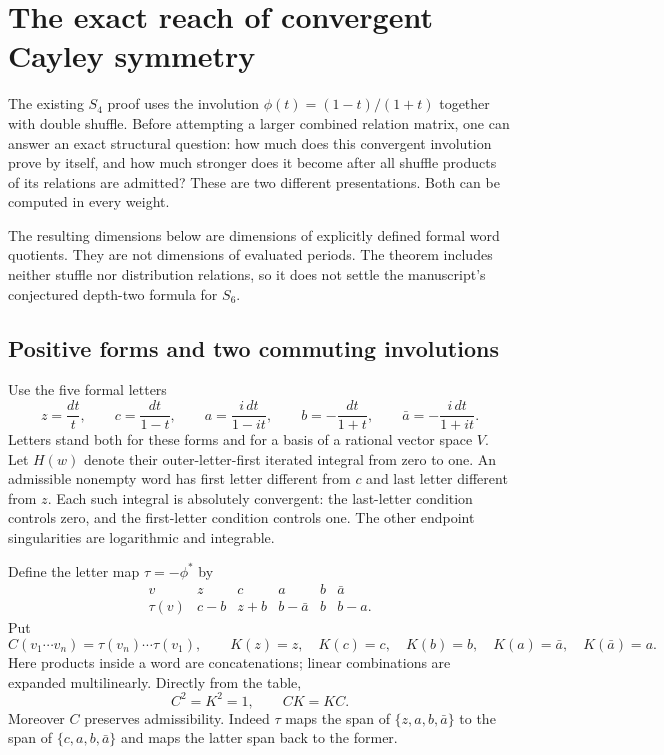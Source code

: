 \section{The exact reach of convergent Cayley symmetry}
\label{cayley:sec:reach}

The existing $S_4$ proof uses the involution
$\phi(t)=(1-t)/(1+t)$ together with double shuffle.  Before attempting a
larger combined relation matrix, one can answer an exact structural
question: how much does this convergent involution prove by itself, and
how much stronger does it become after all shuffle products of its
relations are admitted?  These are two different presentations.  Both
can be computed in every weight.

The resulting dimensions below are dimensions of explicitly defined
formal word quotients.  They are not dimensions of evaluated periods.
The theorem includes neither stuffle nor distribution relations, so it
does not settle the manuscript's conjectured depth-two formula for $S_6$.

\subsection{Positive forms and two commuting involutions}

Use the five formal letters
\[
 z=\frac{dt}{t},\qquad c=\frac{dt}{1-t},\qquad
 a=\frac{i\,dt}{1-it},\qquad
 b=-\frac{dt}{1+t},\qquad
 \bar a=-\frac{i\,dt}{1+it}.
\]
Letters stand both for these forms and for a basis of a rational vector
space $V$.  Let $H(w)$ denote their outer-letter-first iterated integral
from zero to one.  An admissible nonempty word has first letter different
from $c$ and last letter different from $z$.  Each such integral is
absolutely convergent: the last-letter condition controls zero, and the
first-letter condition controls one.  The other endpoint singularities
are logarithmic and integrable.

Define the letter map $\tau=-\phi^*$ by
\begin{equation}\label{cayley:eq:tau}
\begin{array}{c|ccccc}
v&z&c&a&b&\bar a\\ \hline
\tau(v)&c-b&z+b&b-\bar a&b&b-a .
\end{array}
\end{equation}
Put
\[
 C(v_1\cdots v_n)=\tau(v_n)\cdots\tau(v_1),
 \qquad
 K(z)=z,\quad K(c)=c,\quad K(b)=b,\quad K(a)=\bar a,\quad K(\bar a)=a.
\]
Here products inside a word are concatenations; linear combinations are
expanded multilinearly.  Directly from the table,
\[
 C^2=K^2=1,\qquad CK=KC.
\]
Moreover $C$ preserves admissibility.  Indeed $\tau$ maps the span of
$\{z,a,b,\bar a\}$ to the span of $\{c,a,b,\bar a\}$ and maps the latter
span back to the former.

